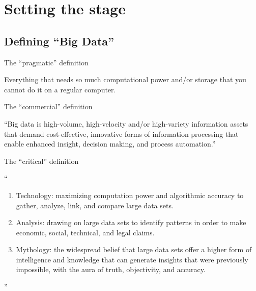 \documentclass{beamer}
\begin{document}
\section{Setting the stage}

\subsection{Defining ``Big Data''}

{
	\begin{frame}[plain]
	\end{frame}
}

\begin{frame}{The ``pragmatic'' definition }
	\begin{block}{}
Everything that needs so much computational power and/or storage that you cannot do it on a regular computer.
	\end{block}
\end{frame}



\begin{frame}{The ``commercial'' definition }
	\begin{block}{\textcite{gartner}}
``Big data is high-volume, high-velocity and/or high-variety information assets that demand cost-effective, innovative forms of information processing that enable enhanced insight, decision making, and process automation.''
	\end{block}
\end{frame}



\begin{frame}{The ``critical'' definition }
	\begin{block}{\textcite{boyd2012}}
``
	\begin{enumerate}
		\item Technology: maximizing computation power and algorithmic accuracy to gather, analyze, link, and compare large data sets.
		\item Analysis: drawing on large data sets to identify patterns in order to make economic, social, technical, and legal claims.
		\item Mythology: the widespread belief that large data sets offer a higher form of intelligence and knowledge that can generate insights that were previously impossible, with the aura of truth, objectivity, and accuracy.
	\end{enumerate}
''
	\end{block}
\end{frame}
\end{document}
